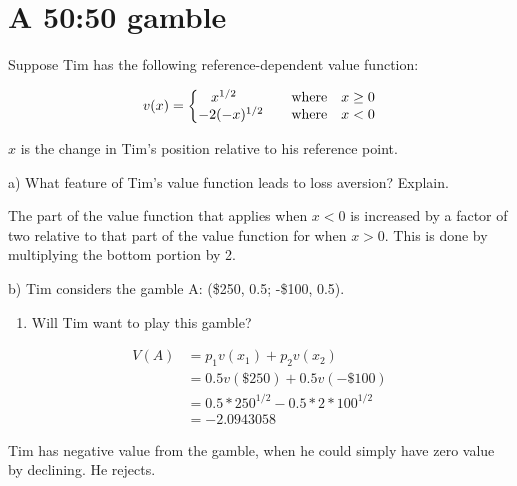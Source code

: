 \documentclass[
  letterpaper,
  DIV=11,
  numbers=noendperiod]{scrreprt}
\providecommand{\tightlist}{%
  \setlength{\itemsep}{0pt}\setlength{\parskip}{0pt}}\usepackage{longtable,booktabs,array}
\begin{document}
\hypertarget{a-5050-gamble-2}{%
\section{A 50:50 gamble}\label{a-5050-gamble-2}}

Suppose Tim has the following reference-dependent value function:

\[
v(x)=\left\{\begin{matrix}
x^{1/2} \qquad &\textrm{where} &\space x \geq 0\\
-2(-x)^{1/2} \quad &\textrm{where} &\space x < 0 
\end{matrix}\right.
\]

\(x\) is the change in Tim's position relative to his reference point.

a) What feature of Tim's value function leads to loss aversion? Explain.

\begin{tcolorbox}[enhanced jigsaw, title=\textcolor{quarto-callout-tip-color}{\faLightbulb}\hspace{0.5em}{Answer}, toprule=.15mm, colback=white, breakable, titlerule=0mm, colframe=quarto-callout-tip-color-frame, coltitle=black, opacityback=0, rightrule=.15mm, colbacktitle=quarto-callout-tip-color!10!white, bottomtitle=1mm, opacitybacktitle=0.6, arc=.35mm, bottomrule=.15mm, toptitle=1mm, leftrule=.75mm, left=2mm]

The part of the value function that applies when \(x<0\) is increased by
a factor of two relative to that part of the value function for when
\(x>0\). This is done by multiplying the bottom portion by 2.

\end{tcolorbox}

b) Tim considers the gamble A: (\$250, 0.5; -\$100, 0.5).

\begin{enumerate}
\def\labelenumi{\roman{enumi})}
\tightlist
\item
  Will Tim want to play this gamble?
\end{enumerate}

\begin{tcolorbox}[enhanced jigsaw, title=\textcolor{quarto-callout-tip-color}{\faLightbulb}\hspace{0.5em}{Answer}, toprule=.15mm, colback=white, breakable, titlerule=0mm, colframe=quarto-callout-tip-color-frame, coltitle=black, opacityback=0, rightrule=.15mm, colbacktitle=quarto-callout-tip-color!10!white, bottomtitle=1mm, opacitybacktitle=0.6, arc=.35mm, bottomrule=.15mm, toptitle=1mm, leftrule=.75mm, left=2mm]

\begin{align*}
V(A)&=p_1v(x_1)+p_2v(x_2) \\
&=0.5v(\$250)+0.5v(-\$100) \\
&=0.5*250^{1/2}-0.5*2*100^{1/2} \\
&=-2.0943058
\end{align*}

Tim has negative value from the gamble, when he could simply have zero
value by declining. He rejects.

\end{tcolorbox}
\end{document}
